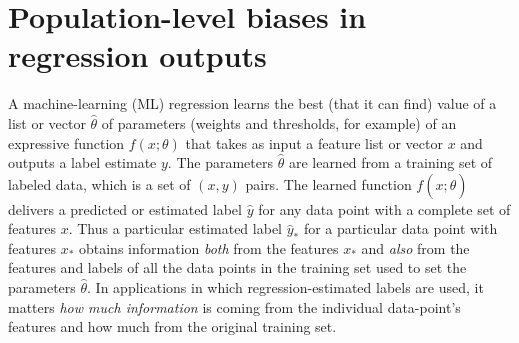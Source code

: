 \documentclass[11pt]{article}
\begin{document}
{\raggedright


}

\clearpage\appendix
\section{Population-level biases in regression outputs}\label{app:toy}
A machine-learning (ML) regression learns the best (that it can find) value of a list or vector $\hat{\theta}$ of parameters (weights and thresholds, for example) of an expressive function $f(x;\theta)$ that takes as input a feature list or vector $x$ and outputs a label estimate $y$.
The parameters $\hat{\theta}$ are learned from a training set of labeled data, which is a set of $(x, y)$ pairs.
The learned function $f(x;\hat{\theta})$ delivers a predicted or estimated label $\hat{y}$ for any data point with a complete set of features $x$.
Thus a particular estimated label $\hat{y}_\ast$ for a particular data point with features $x_\ast$ obtains information \emph{both} from the features $x_\ast$ and \emph{also} from the features and labels of all the data points in the training set used to set the parameters $\hat{\theta}$.
In applications in which regression-estimated labels are used, it matters \emph{how much information} is coming from the individual data-point's features and how much from the original training set.
\end{document}
